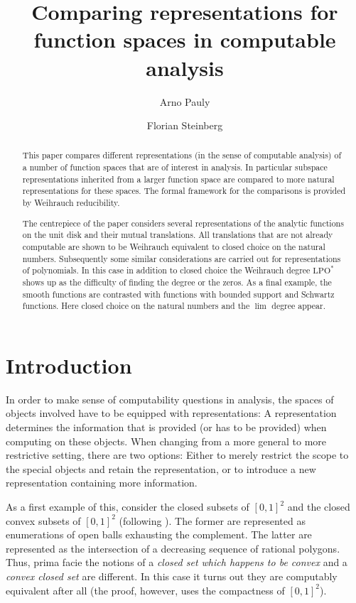 \documentclass{eptcs-modified}
\title{Comparing representations for function spaces in computable analysis}
\author{
Arno Pauly
\institute{Computer Laboratory\\ University of Cambridge, United Kingdom \\ \& \\
D\'epartement d'Informatique\\ Universit\'e Libre de Bruxelles, Belgium
\email{Arno.Pauly@cl.cam.ac.uk}}
\and
Florian Steinberg
\institute{Fachbereich Mathematik\\ TU-Darmstadt, Germany
\email{steinberg@mathematik.tu-darmstadt.de}}
}
\newcommand{\uint}{{[0,1]}}
\newcommand{\lpo}{\textrm{LPO}}
\begin{document}
 \theoremstyle{definition}

	\maketitle

	\begin{abstract}
		This paper compares different representations (in the sense of computable analysis) of a number of function spaces that are of interest in analysis.
		In particular subspace representations inherited from a larger function space are compared to more natural representations for these spaces.
		The formal framework for the comparisons is provided by Weihrauch reducibility.

		The centrepiece of the paper considers several representations of the analytic functions on the unit disk and their mutual translations.
		All translations that are not already computable are shown to be Weihrauch equivalent to closed choice on the natural numbers.
		Subsequently some similar considerations are carried out for representations of polynomials.
		In this case in addition to closed choice the Weihrauch degree $\lpo^*$ shows up as the difficulty of finding the degree or the zeros.
		As a final example, the smooth functions are contrasted with functions with bounded support and Schwartz functions.
		Here closed choice on the natural numbers and the $\lim$ degree appear.
\end{abstract}
	\tableofcontents

	\section{Introduction}
		In order to make sense of computability questions in analysis, the spaces of objects involved have to be equipped with representations:
		A representation determines the information that is provided (or has to be provided) when computing on these objects.
		When changing from a more general to more restrictive setting, there are two options:
		Either to merely restrict the scope to the special objects and retain the representation, or to introduce a new representation containing more information.

		As a first example of this, consider the closed subsets of $\uint^2$ and the closed convex subsets of $\uint^2$ (following \cite{paulyleroux}).
		The former are represented as enumerations of open balls exhausting the complement.
		The latter are represented as the intersection of a decreasing sequence of rational polygons.
		Thus, prima facie the notions of a \emph{closed set which happens to be convex} and a \emph{convex closed set} are different.
		In this case it turns out they are computably equivalent after all (the proof, however, uses the compactness of $\uint^2$).
\end{document}
